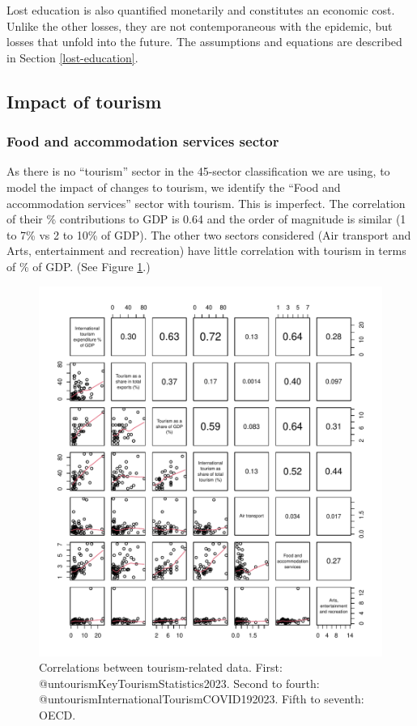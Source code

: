 \documentclass[
]{article}
\begin{document}
Lost education is also quantified monetarily and constitutes an economic cost. Unlike the other losses, they are not contemporaneous with the epidemic, but losses that unfold into the future. The assumptions and equations are described in Section \ref{lost-education}.

\subsection{Impact of tourism}\label{impact-of-tourism}

\subsubsection{Food and accommodation services sector}\label{food-and-accommodation-services-sector}

As there is no ``tourism'' sector in the 45-sector classification we are using, to model the impact of changes to tourism, we identify the ``Food and accommodation services'' sector with tourism. This is imperfect. The correlation of their \% contributions to GDP is 0.64 and the order of magnitude is similar (1 to 7\% vs 2 to 10\% of GDP). The other two sectors considered (Air transport and Arts, entertainment and recreation) have little correlation with tourism in terms of \% of GDP. (See Figure \ref{fig:pairs}.)

\begin{figure}

{\centering \includegraphics{README_files/figure-latex/pairs-1} 

}

\caption{Correlations between tourism-related data. First: @untourismKeyTourismStatistics2023. Second to fourth: @untourismInternationalTourismCOVID192023. Fifth to seventh: OECD.}\label{fig:pairs}
\end{figure}
\end{document}
